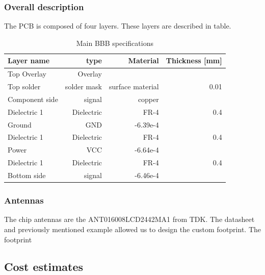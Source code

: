 \subsubsection{Overall description}
The PCB is composed of four layers. These layers are described in table.
\begin{table}[!htbp]
  \begin{center}
    \begin{tabular}{|l|r|r|r|}%
      \hline
        Layer name & type & Material & Thickness [mm] \\ \hline \hline
        Top Overlay & Overlay & & \\ \hline
        Top solder & solder mask & surface material & 0.01 \\ \hline
        Component side & signal & copper &  \\ \hline
        Dielectric 1 & Dielectric & FR-4 & 0.4 \\ \hline
        Ground & GND & -6.39e-4\\ \hline
        Dielectric 1 & Dielectric & FR-4 & 0.4 \\ \hline
        Power & VCC & -6.64e-4\\ \hline
        Dielectric 1 & Dielectric & FR-4 & 0.4 \\ \hline
        Bottom side & signal & -6.46e-4\\ \hline
         \hline
    \end{tabular}
  \end{center}
  \caption {Main BBB specifications} \label{tab:bbb specs}
\end{table}


\subsubsection{Antennas}
The chip antennas are the ANT016008LCD2442MA1 from TDK. The datasheet and previously mentioned example allowed us to design the custom footprint. The footprint
\subsection{Cost estimates}
